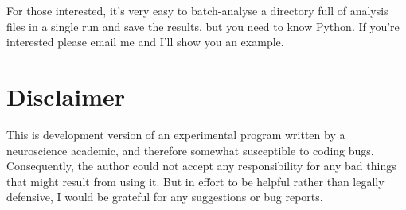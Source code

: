 \documentclass{article}
\begin{document}
For those interested, it's very easy to batch-analyse a directory full of analysis files in a single run and save the
results, but you need to know Python. If you're interested please email me and I'll show you an example.

\section{Disclaimer}

This is development version of an experimental program written by a neuroscience academic, and therefore somewhat
susceptible to coding bugs. Consequently, the author could not accept any responsibility for any bad things that might
result from using it. But in effort to be helpful rather than legally defensive, I would be grateful for any suggestions
or bug reports. 
\end{document}
